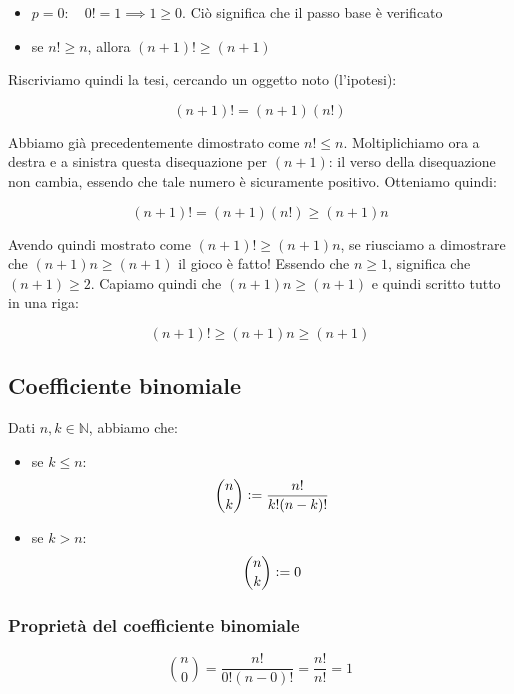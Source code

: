 \documentclass{article}
\begin{document}
\begin{itemize}
    \item $p = 0: \quad 0! = 1 \implies 1 \geq 0$. Ciò significa che il passo base è verificato
    \item se $n! \geq n$, allora $(n+1)! \geq (n+1)$
\end{itemize}

\noindent Riscriviamo quindi la tesi, cercando un oggetto noto (l'ipotesi):

\begin{equation*}
    (n+1)! = (n+1)(n!)
\end{equation*}

\noindent Abbiamo già precedentemente dimostrato come $n! \leq n$. Moltiplichiamo ora a destra e a sinistra questa disequazione per $(n+1)$: il verso della disequazione non cambia, essendo che tale numero è sicuramente positivo. Otteniamo quindi:

\begin{equation*}
    (n+1)! = (n+1)(n!) \geq (n+1)n
\end{equation*}

\noindent Avendo quindi mostrato come $(n+1)! \geq (n+1)n$, se riusciamo a dimostrare che $(n+1)n \geq (n+1)$ il gioco è fatto! Essendo che $n \geq 1$, significa che $(n+1) \geq 2$. Capiamo quindi che $(n+1)n \geq (n+1)$ e quindi scritto tutto in una riga:

\begin{equation*}
    (n+1)! \geq (n+1)n \geq (n+1)
\end{equation*}

\subsection{Coefficiente binomiale}
Dati $n, k \in \mathbb{N}$, abbiamo che:

\begin{itemize}
    \item se $k \leq n$: $$\binom{n}{k} \vcentcolon = \dfrac{n!}{k!(n-k)!}$$
    \item se $k > n$: $$\binom{n}{k} \vcentcolon = 0$$
\end{itemize}

\subsubsection{Proprietà del coefficiente binomiale}
\begin{equation*}
    \binom{n}{0} = \frac{n!}{0!(n - 0)!} = \frac{n!}{n!} = 1
\end{equation*}
\end{document}
